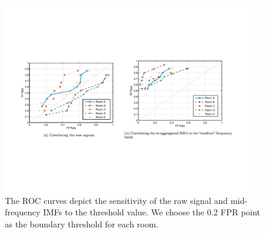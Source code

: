 \begin{figure}[ht!]
\centering
	 \includegraphics[width=0.95\textwidth]{figs/ROCgraphs}
\caption{The ROC curves depict the sensitivity of the raw signal and mid-frequency IMFs to the threshold value. We choose the 0.2 FPR point as the boundary threshold for each room. }
\label{fig:roc}
\end{figure}

